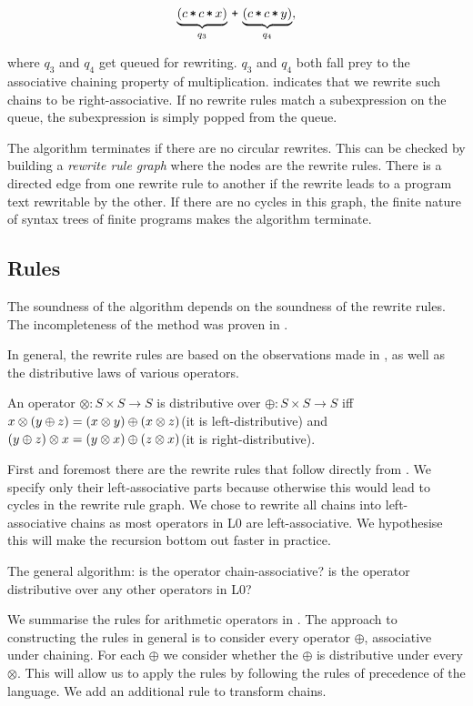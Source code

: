 \[\underbrace{\p{c \lt c \lt x}}_{q_3} \lp \underbrace{\p{c \lt c \lt
y}}_{q_4},\]

where $q_3$ and $q_4$ get queued for rewriting. $q_3$ and $q_4$ both fall prey
to the associative chaining property of multiplication.
 indicates that we rewrite such chains to be
right-associative. If no rewrite rules match a subexpression on the queue, the
subexpression is simply popped from the queue.

The algorithm terminates if there are no circular rewrites. This can be checked
by building a \emph{rewrite rule graph} where the nodes are the rewrite rules.
There is a directed edge from one rewrite rule to another if the rewrite leads
to a program text rewritable by the other. If there are no cycles in this
graph, the finite nature of syntax trees of finite programs makes the algorithm
terminate.

\subsection{Rules}

The soundness of the algorithm depends on the soundness of the rewrite rules.
The incompleteness of the method was proven in . 

In general, the rewrite rules are based on the observations made in
, as well as the distributive laws of various
operators.

An operator $\otimes:S\times S\rightarrow S$ is distributive over
$\oplus:S\times S \rightarrow S$ iff $x \otimes \left({ y \oplus z }\right) = \left({x \otimes
y}\right) \oplus \left({x \otimes z}\right)$(it is left-distributive) and $\left({y \oplus z}\right) \otimes
x = \left({y \otimes x}\right) \oplus \left({z \otimes x}\right)$(it is right-distributive).

First and foremost there are the rewrite rules that follow directly from
. We specify only their left-associative parts because
otherwise this would lead to cycles in the rewrite rule graph. We chose to
rewrite all chains into left-associative chains as most operators in L0 are
left-associative. We hypothesise this will make the recursion bottom out faster
in practice.

The general algorithm: is the operator chain-associative? is the operator
distributive over any other operators in L0?

We summarise the rules for arithmetic operators in
. The approach to constructing the rules in
general is to consider every operator $\oplus$, associative under chaining. For
each $\oplus$ we consider whether the $\oplus$ is distributive under every
$\otimes$. This will allow us to apply the rules by following the rules of
precedence of the language. We add an additional rule to transform chains.

